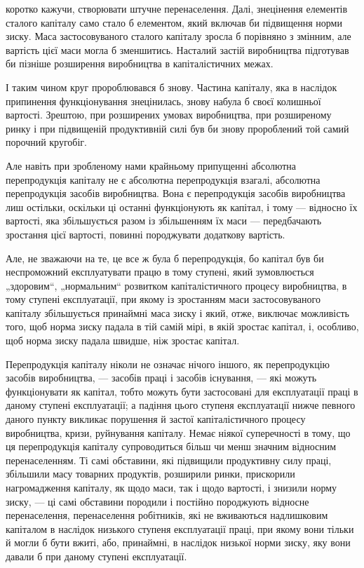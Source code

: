 \parcont{}  %
коротко кажучи, створювати штучне перенаселення. Далі, знецінення
елементів сталого капіталу само стало б елементом,
який включав би підвищення норми зиску. Маса застосовуваного
сталого капіталу зросла б порівняно з змінним, але вартість
цієї маси могла б зменшитись. Насталий застій виробництва
підготував би пізніше розширення виробництва в капіталістичних
межах.

І таким чином круг пророблювався б знову. Частина капіталу,
яка в наслідок припинення функціонування знецінилась,
знову набула б своєї колишньої вартості. Зрештою, при розширених
умовах виробництва, при розширеному ринку і при підвищеній
продуктивній силі був би знову пророблений той самий
порочний кругобіг.

Але навіть при зробленому нами крайньому припущенні абсолютна
перепродукція капіталу не є абсолютна перепродукція
взагалі, абсолютна перепродукція засобів виробництва. Вона
є перепродукція засобів виробництва лиш остільки, оскільки ці
останні функціонують як капітал, і тому — відносно їх вартості,
яка збільшується разом із збільшенням їх маси — передбачають
зростання цієї вартості, повинні породжувати додаткову
вартість.

Але, не зважаючи на те, це все ж була б перепродукція,
бо капітал був би неспроможний експлуатувати працю в тому
ступені, який зумовлюється „здоровим“, „нормальним“ розвитком
капіталістичного процесу виробництва, в тому ступені експлуатації,
при якому із зростанням маси застосовуваного капіталу
збільшується принаймні маса зиску і який, отже, виключає
можливість того, щоб норма зиску падала в тій самій мірі,
в якій зростає капітал, і, особливо, щоб норма зиску падала
швидше, ніж зростає капітал.

Перепродукція капіталу ніколи не означає нічого іншого, як
перепродукцію засобів виробництва, — засобів праці і засобів
існування, — які можуть функціонувати як капітал, тобто можуть
бути застосовані для експлуатації праці в даному ступені експлуатації;
а падіння цього ступеня експлуатації нижче певного
даного пункту викликає порушення й застої капіталістичного процесу
виробництва, кризи, руйнування капіталу. Немає ніякої суперечності
в тому, що ця перепродукція капіталу супроводиться
більш чи менш значним відносним перенаселенням. Ті самі обставини,
які підвищили продуктивну силу праці, збільшили масу
товарних продуктів, розширили ринки, прискорили нагромадження
капіталу, як щодо маси, так і щодо вартості, і знизили норму
зиску, — ці самі обставини породили і постійно породжують відносне
перенаселення, перенаселення робітників, які не вживаються
надлишковим капіталом в наслідок низького ступеня експлуатації
праці, при якому вони тільки й могли б бути вжиті, або, принаймні,
в наслідок низької норми зиску, яку вони давали б при даному
ступені експлуатації.
